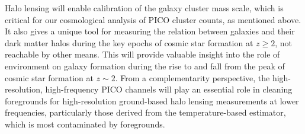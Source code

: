 \documentclass[PICOReport.tex]{subfiles}
\begin{document}
Halo lensing will enable calibration of the galaxy cluster mass scale, which is critical for our cosmological analysis of PICO cluster counts, as mentioned above.  It also gives a unique tool for measuring the relation between galaxies and their dark matter halos during the key epochs of cosmic star formation at $z\geq 2$, not reachable by other means.  This will provide valuable insight into the role of environment on galaxy formation during the rise to and fall from the peak of cosmic star formation at $z\sim 2$.  From a complementarity perspective, the high-resolution, high-frequency PICO channels will play an essential role in cleaning foregrounds for high-resolution ground-based halo lensing measurements at lower frequencies, particularly those derived from the temperature-based estimator, which is most contaminated by foregrounds. 
%
%
\end{document}
